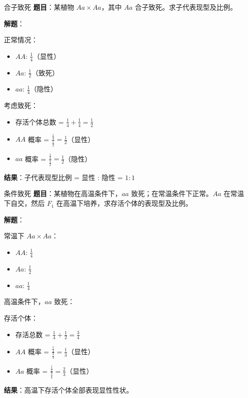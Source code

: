 \documentclass[a4paper,11pt]{ctexart}
\begin{document}
\begin{examplebox}{合子致死}
\textbf{题目}：某植物 $Aa \times Aa$，其中 $Aa$ 合子致死。求子代表现型及比例。

\textbf{解题}：

正常情况：
\begin{itemize}[leftmargin=2em]
    \item $AA$: $\frac{1}{4}$（显性）
    \item $Aa$: $\frac{1}{2}$（致死）
    \item $aa$: $\frac{1}{4}$（隐性）
\end{itemize}

考虑致死：
\begin{itemize}[leftmargin=2em]
    \item 存活个体总数 = $\frac{1}{4} + \frac{1}{4} = \frac{1}{2}$
    \item $AA$ 概率 = $\frac{\frac{1}{4}}{\frac{1}{2}} = \frac{1}{2}$（显性）
    \item $aa$ 概率 = $\frac{\frac{1}{4}}{\frac{1}{2}} = \frac{1}{2}$（隐性）
\end{itemize}

\textbf{结果}：子代表现型比例 = 显性 : 隐性 = $1:1$
\end{examplebox}

\begin{examplebox}{条件致死}
\textbf{题目}：某植物在高温条件下，$aa$ 致死；在常温条件下正常。$Aa$ 在常温下自交，然后 $F_1$ 在高温下培养，求存活个体的表现型及比例。

\textbf{解题}：

常温下 $Aa \times Aa$：
\begin{itemize}[leftmargin=2em]
    \item $AA$: $\frac{1}{4}$
    \item $Aa$: $\frac{1}{2}$
    \item $aa$: $\frac{1}{4}$
\end{itemize}

高温条件下，$aa$ 致死：

存活个体：
\begin{itemize}[leftmargin=2em]
    \item 存活总数 = $\frac{1}{4} + \frac{1}{2} = \frac{3}{4}$
    \item $AA$ 概率 = $\frac{\frac{1}{4}}{\frac{3}{4}} = \frac{1}{3}$（显性）
    \item $Aa$ 概率 = $\frac{\frac{1}{2}}{\frac{3}{4}} = \frac{2}{3}$（显性）
\end{itemize}

\textbf{结果}：高温下存活个体全部表现显性性状。
\end{examplebox}
\end{document}
